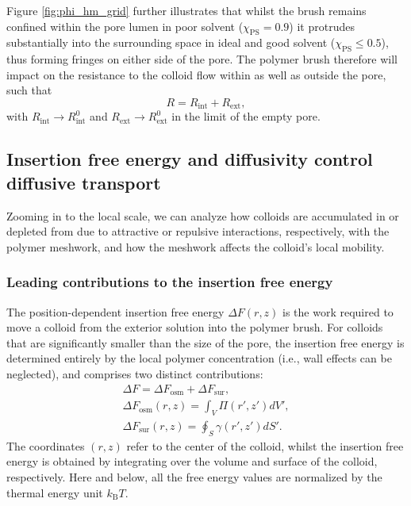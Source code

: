 \documentclass[12pt, a4paper]{article}
\begin{document}
Figure \ref{fig:phi_hm_grid} further illustrates that whilst the brush remains confined within the pore lumen in poor solvent ($\chi_{\text{PS}}=0.9$) it protrudes substantially into the surrounding space in ideal and good solvent ($\chi_{\text{PS}}\le0.5$), thus forming fringes on either side of the pore.
The polymer brush therefore will impact on the resistance to the colloid flow within as well as outside the pore, such that
\begin{equation}
    R=R_{\text{int}}+R_{\text{ext}},
    \label{eq:R_tot_tot}
\end{equation}
with $R_{\text{int}}\rightarrow R_{\text{int}}^{0}$ and $R_{\text{ext}}\rightarrow R_{\text{ext}}^{0}$ in the limit of the empty pore.


\subsection{Insertion free energy and diffusivity control diffusive transport}

Zooming in to the local scale, we can analyze how colloids are accumulated in or depleted from due to attractive or repulsive interactions, respectively, with the polymer meshwork, and how the meshwork affects the colloid's local mobility.


\subsubsection{Leading contributions to the insertion free energy}

The position-dependent insertion free energy $\Delta F(r,z)$ is the work required to move a colloid from the exterior solution into the polymer brush.
For colloids that are significantly smaller than the size of the pore, the insertion free energy is determined entirely by the local polymer concentration (i.e., wall effects can be neglected), and comprises two distinct contributions:
\begin{eqnarray}
    \Delta F = \Delta F_{\text{osm}} + \Delta F_{\text{sur}},
    \label{eq:Delta_F}
    \\
    \Delta F_{\text{osm}}(r,z) = \int_{V} \Pi(r',z') dV', \nonumber
    \\
    \Delta F_{\text{sur}}(r,z) = \oint_{S} \gamma (r',z') dS'. \nonumber
\end{eqnarray}
The coordinates $(r,z)$ refer to the center of the colloid, whilst the insertion free energy is obtained by integrating over the volume and surface of the colloid, respectively.
Here and below, all the free energy values are normalized by the thermal energy unit $k_{\text{B}}T$.
\end{document}
